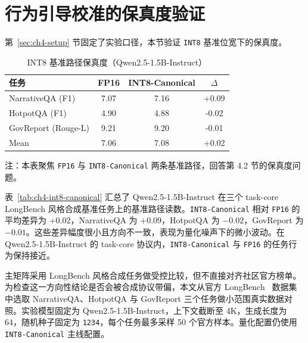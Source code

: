 \section{行为引导校准的保真度验证}
\label{sec:ch4-rq1}
\label{subsec:ch4-int8-canonical}
\label{subsec:exp-int8-canonical}

第~\ref{sec:ch4-setup} 节固定了实验口径，本节验证 \texttt{INT8} 基准位宽下的保真度。

\begin{table}[H]
  \centering
  \caption{INT8 基准路径保真度（Qwen2.5-1.5B-Instruct）}
  \label{tab:ch4-int8-canonical}
  \label{tab:t1-int8-canonical}
  {%
  \footnotesize
  \setlength{\tabcolsep}{4pt}
  \renewcommand{\arraystretch}{1.05}
  \begin{tabular}{lccc}
    \toprule
    任务 & FP16 & INT8-Canonical & $\Delta$ \\
    \midrule
    NarrativeQA (F1)        & 7.07 & 7.16 & +0.09 \\
    HotpotQA (F1)           & 4.90 & 4.88 & -0.02 \\
    GovReport (Rouge-L)     & 9.21 & 9.20 & -0.01 \\
    Mean                    & 7.06 & 7.08 & +0.02 \\
    \bottomrule
  \end{tabular}

  \vspace{0.35em}
  \begin{minipage}{0.94\linewidth}
    \footnotesize
    注：本表聚焦 \texttt{FP16} 与 \texttt{INT8-Canonical} 两条基准路径，回答第 4.2 节的保真度问题。
  \end{minipage}
  }
\end{table}

表~\ref{tab:ch4-int8-canonical} 汇总了 Qwen2.5-1.5B-Instruct 在三个 task-core LongBench 风格合成基准任务上的基准路径读数。\texttt{INT8-Canonical} 相对 \texttt{FP16} 的平均差异为 $+0.02$，NarrativeQA 为 $+0.09$，HotpotQA 为 $-0.02$，GovReport 为 $-0.01$。这些差异幅度很小且方向不一致，表现为量化噪声下的微小波动。在 Qwen2.5-1.5B-Instruct 的 task-core 协议内，\texttt{INT8-Canonical} 与 \texttt{FP16} 的任务行为保持接近。

\label{subsec:ch4-longbench-official}
主矩阵采用 LongBench 风格合成任务做受控比较，但不直接对齐社区官方榜单。为检查这一方向性结论是否会被合成协议带偏，本文从官方 LongBench~\cite{bai2024longbench} 数据集中选取 NarrativeQA、HotpotQA 与 GovReport 三个任务做小范围真实数据对照。实验模型固定为 Qwen2.5-1.5B-Instruct，上下文截断至 4K，生成长度为 64，随机种子固定为 \texttt{1234}，每个任务最多采样 50 个官方样本。量化配置仍使用 \texttt{INT8-Canonical} 主线配置。

